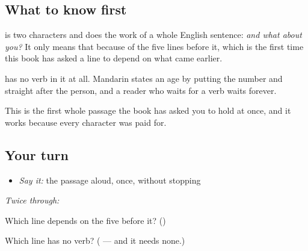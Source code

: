 \subsection*{What to know first}
\textbf{} is two characters and does the work of a whole English sentence: \emph{and what about you?} It only means that because of the five lines before it, which is the first time this book has asked a line to depend on what came earlier.

\textbf{} has no verb in it at all. Mandarin states an age by putting the number and  straight after the person, and a reader who waits for a verb waits forever.

This is the first whole passage the book has asked you to hold at once, and it works because every character was paid for.

\subsection*{Your turn}
\begin{itemize}
\raggedright
  \item \emph{Say it:} the passage aloud, once, without stopping
\end{itemize}

\emph{Twice through:}

\begin{tcolorbox}[breakable,colback=teal!4,colframe=teal!35!black,title={Before you move on}]
Which line depends on the five before it? (\textbf{})

Which line has no verb? (\textbf{} — and it needs none.)
\end{tcolorbox}
